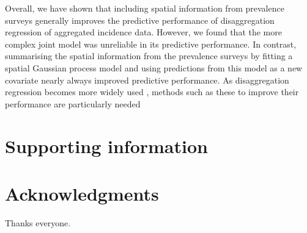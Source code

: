 \documentclass[10pt,letterpaper]{article}
\begin{document}
Overall, we have shown that including spatial information from prevalence surveys generally improves the predictive performance of disaggregation regression of aggregated incidence data.
However, we found that the more complex joint model was unreliable in its predictive performance.
In contrast, summarising the spatial information from the prevalence surveys by fitting a spatial Gaussian process model and using predictions from this model as a new covariate nearly always improved predictive performance.
As disaggregation regression becomes more widely used \cite{weiss2019mapping, battle2019mapping}, methods such as these to improve their performance are particularly needed


\section*{Supporting information}



\section*{Acknowledgments}
Thanks everyone.


\nolinenumbers

%
%
% 
 



\end{document}
